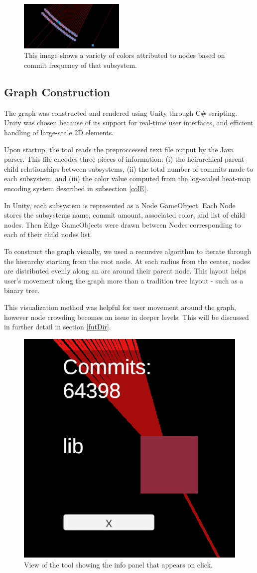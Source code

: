 \documentclass[conference]{IEEEtran}
\begin{document}
\begin{figure}[h!]
	\centering
	\includegraphics[width=0.45\textwidth]{randomSection.png}
	\caption{This image shows a variety of colors attributed to nodes based on commit frequency of that subsystem.}
	\label{in}
\end{figure}

\subsection{Graph Construction}
\label{graphC}
The graph was constructed and rendered using Unity through C\# scripting. Unity was chosen because of its support for real-time user interfaces, and efficient handling of large-scale 2D elements.

Upon startup, the tool reads the preproccessed text file output by the Java parser. This file encodes three pieces of information: (i) the heirarchical parent-child relationships between subsystems, (ii) the total number of commits made to each subsystem, and (iii) the color value computed from the log-scaled heat-map encoding system described in subsection \ref{colE}.

In Unity, each subsystem is represented as a Node GameObject. Each Node stores the subsystems name, commit amount, associated color, and list of child nodes. Then Edge GameObjects were drawn between Nodes corresponding to each of their child nodes list.

To construct the graph visually, we used a recursive algorithm to iterate through the hierarchy starting from the root node. At each radius from the center, nodes are distributed evenly along an arc around their parent node. This layout helps user's movement along the graph more than a tradition tree layout - such as a binary tree. 

This visualization method was helpful for user movement around the graph, however node crowding becomes an issue in deeper levels. This will be discussed in further detail in section \ref{futDir}.

\begin{figure}[h!]
	\centering
	\includegraphics[width = .3\textwidth]{commitPanel.png}
	\caption{View of the tool showing the info panel that appears on click.}
	\label{inner}
\end{figure}
\end{document}
